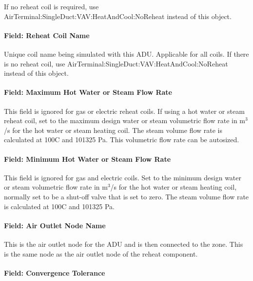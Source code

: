 If no reheat coil is required, use AirTerminal:SingleDuct:VAV:HeatAndCool:NoReheat instead of this object.

\paragraph{Field: Reheat Coil Name}\label{field-reheat-coil-name-2}

Unique coil name being simulated with this ADU. Applicable for all coils. If there is no reheat coil, use AirTerminal:SingleDuct:VAV:HeatAndCool:NoReheat instead of this object.

\paragraph{Field: Maximum Hot Water or Steam Flow Rate}\label{field-maximum-hot-water-or-steam-flow-rate-3}

This field is ignored for gas or electric reheat coils. If using a hot water or steam reheat coil, set to the maximum design water or steam volumetric flow rate in m\(^{3}\)/s for the hot water or steam heating coil. The steam volume flow rate is calculated at 100C and 101325 Pa. This volumetric flow rate can be autosized.

\paragraph{Field: Minimum Hot Water or Steam Flow Rate}\label{field-minimum-hot-water-or-steam-flow-rate-3}

This field is ignored for gas and electric coils. Set to the minimum design water or steam volumetric flow rate in m\(^{3}\)/s for the hot water or steam heating coil, normally set to be a shut-off valve that is set to zero. The steam volume flow rate is calculated at 100C and 101325 Pa.

\paragraph{Field: Air Outlet Node Name}\label{field-air-outlet-node-name-3}

This is the air outlet node for the ADU and is then connected to the zone. This is the same node as the air outlet node of the reheat component.

\paragraph{Field: Convergence Tolerance}\label{field-convergence-tolerance-2}

